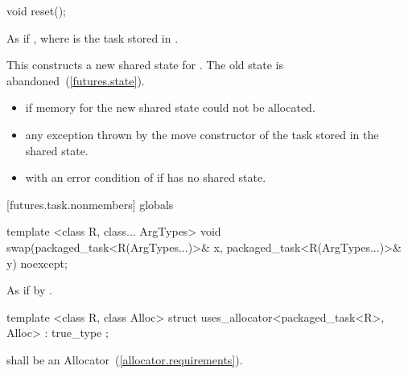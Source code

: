 %
%
\begin{itemdecl}
void reset();
\end{itemdecl}

\begin{itemdescr}
\pnum
\effects As if , where
 is the task stored in
. \begin{note} This constructs a new shared state for . The
old state is abandoned~(\ref{futures.state}). \end{note}

\pnum
\throws
\begin{itemize}
\item {} if memory for the new shared state could not be allocated.
\item any exception thrown by the move constructor of the task stored in the shared
state.
\item {} with an error condition of  if 
has no shared state.
\end{itemize}
\end{itemdescr}

[futures.task.nonmembers]{ globals}

%
%
\begin{itemdecl}
template <class R, class... ArgTypes>
  void swap(packaged_task<R(ArgTypes...)>& x, packaged_task<R(ArgTypes...)>& y) noexcept;
\end{itemdecl}

\begin{itemdescr}
\pnum
\effects As if by .
\end{itemdescr}

%
\begin{itemdecl}
template <class R, class Alloc>
  struct uses_allocator<packaged_task<R>, Alloc>
    : true_type { };
\end{itemdecl}

\begin{itemdescr}
\pnum
\requires {} shall be an Allocator~(\ref{allocator.requirements}).
\end{itemdescr}
